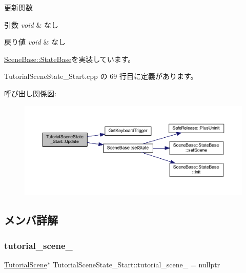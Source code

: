 更新関数 


\begin{DoxyParams}{引数}
{\em void} & なし \\
\hline
\end{DoxyParams}

\begin{DoxyRetVals}{戻り値}
{\em void} & なし \\
\hline
\end{DoxyRetVals}


\mbox{\hyperlink{class_scene_base_1_1_state_base_ad2c6c8fd9f020eb02f64f394edee129c}{Scene\+Base\+::\+State\+Base}}を実装しています。



 Tutorial\+Scene\+State\+\_\+\+Start.\+cpp の 69 行目に定義があります。

呼び出し関係図\+:
\nopagebreak
\begin{figure}[H]
\begin{center}
\leavevmode
\includegraphics[width=350pt]{class_tutorial_scene_state___start_a93c322692bf56172f383d3e5b17cd85c_cgraph}
\end{center}
\end{figure}


\subsection{メンバ詳解}
\mbox{\label{class_tutorial_scene_state___start_a1fea5f4f4713a1461a86cbc9fc263e41}} 
\subsubsection{\texorpdfstring{tutorial\+\_\+scene\+\_\+}{tutorial\_scene\_}}
{\footnotesize\ttfamily \mbox{\hyperlink{class_tutorial_scene}{Tutorial\+Scene}}$\ast$ Tutorial\+Scene\+State\+\_\+\+Start\+::tutorial\+\_\+scene\+\_\+ = nullptr\hspace{0.3cm}{\ttfamily [protected]}}




